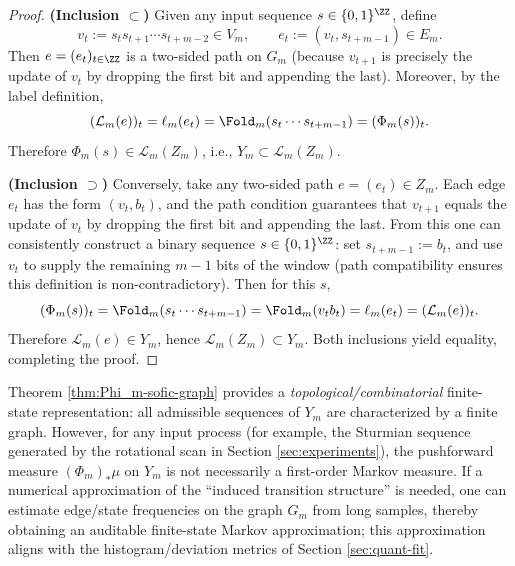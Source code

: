 \begin{proof}
\textbf{(Inclusion $\subset$)} Given any input sequence $s\in\{0,1\}^{\ZZ}$, define
\[
v_t:=s_t s_{t+1}\cdots s_{t+m-2}\in V_m,\qquad
e_t:=(v_t,s_{t+m-1})\in E_m.
\]
Then $e=(e_t)_{t\in\ZZ}$ is a two-sided path on $G_m$ (because $v_{t+1}$ is precisely the update of $v_t$ by dropping the first bit and appending the last). Moreover, by the label definition,
\[
(\mathcal{L}_m(e))_t=\ell_m(e_t)=\Fold_m(s_t\cdots s_{t+m-1})=(\Phi_m(s))_t.
\]
Therefore $\Phi_m(s)\in \mathcal{L}_m(Z_m)$, i.e., $Y_m\subset \mathcal{L}_m(Z_m)$.

\textbf{(Inclusion $\supset$)} Conversely, take any two-sided path $e=(e_t)\in Z_m$. Each edge $e_t$ has the form $(v_t,b_t)$, and the path condition guarantees that $v_{t+1}$ equals the update of $v_t$ by dropping the first bit and appending the last. From this one can consistently construct a binary sequence $s\in\{0,1\}^{\ZZ}$: set $s_{t+m-1}:=b_t$, and use $v_t$ to supply the remaining $m-1$ bits of the window (path compatibility ensures this definition is non-contradictory). Then for this $s$,
\[
(\Phi_m(s))_t=\Fold_m(s_t\cdots s_{t+m-1})=\Fold_m(v_t b_t)=\ell_m(e_t)=(\mathcal{L}_m(e))_t.
\]
Therefore $\mathcal{L}_m(e)\in Y_m$, hence $\mathcal{L}_m(Z_m)\subset Y_m$. Both inclusions yield equality, completing the proof.
\end{proof}





\begin{remark}\label{rem:Phi_m-not-markov}
Theorem \ref{thm:Phi_m-sofic-graph} provides a \emph{topological/combinatorial} finite-state representation: all admissible sequences of $Y_m$ are characterized by a finite graph. However, for any input process (for example, the Sturmian sequence generated by the rotational scan in Section \ref{sec:experiments}), the pushforward measure $(\Phi_m)_*\mu$ on $Y_m$ is not necessarily a first-order Markov measure. If a numerical approximation of the ``induced transition structure'' is needed, one can estimate edge/state frequencies on the graph $G_m$ from long samples, thereby obtaining an auditable finite-state Markov approximation; this approximation aligns with the histogram/deviation metrics of Section \ref{sec:quant-fit}.
\end{remark}
